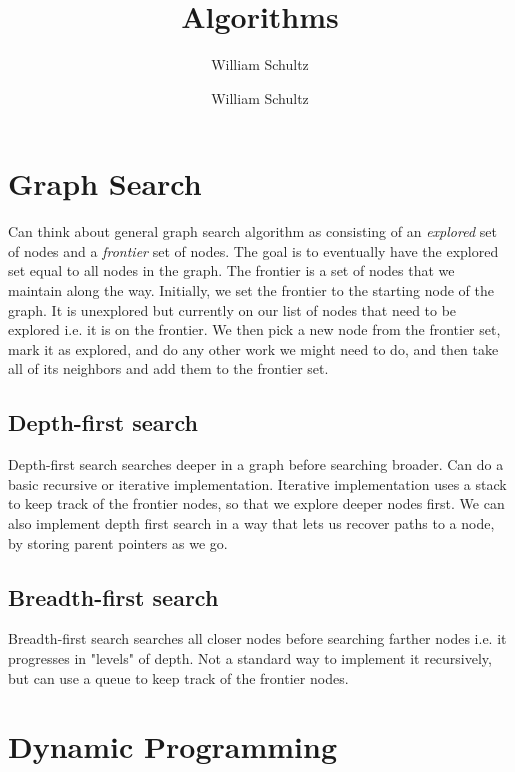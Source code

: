 \documentclass[10pt,a4paper]{article}
\author{William Schultz}
\begin{document}
\title{Algorithms}
\author{William Schultz}
\maketitle

\newcommand{\concept}[1]{\textcolor{blue}{\textit{\textbf{#1}}}}

\section{Graph Search}

Can think about general graph search algorithm as consisting of an \textit{explored} set of nodes and a \textit{frontier} set of nodes. The goal is to eventually have the explored set equal to all nodes in the graph. The frontier is a set of nodes that we maintain along the way. Initially, we set the frontier to the starting node of the graph. It is unexplored but currently on our list of nodes that need to be explored i.e. it is on the frontier. We then pick a new node from the frontier set, mark it as explored, and do any other work we might need to do, and then take all of its neighbors and add them to the frontier set.

\subsection{Depth-first search}
Depth-first search searches deeper in a graph before searching broader. Can do a basic recursive or iterative implementation. Iterative implementation uses a stack to keep track of the frontier nodes, so that we explore deeper nodes first. We can also implement depth first search in a way that lets us recover paths to a node, by storing parent pointers as we go.

\subsection{Breadth-first search}
Breadth-first search searches all closer nodes before searching farther nodes i.e. it progresses in "levels" of depth. Not a standard way to implement it recursively, but can use a queue to keep track of the frontier nodes.

\section{Dynamic Programming}
\end{document}
